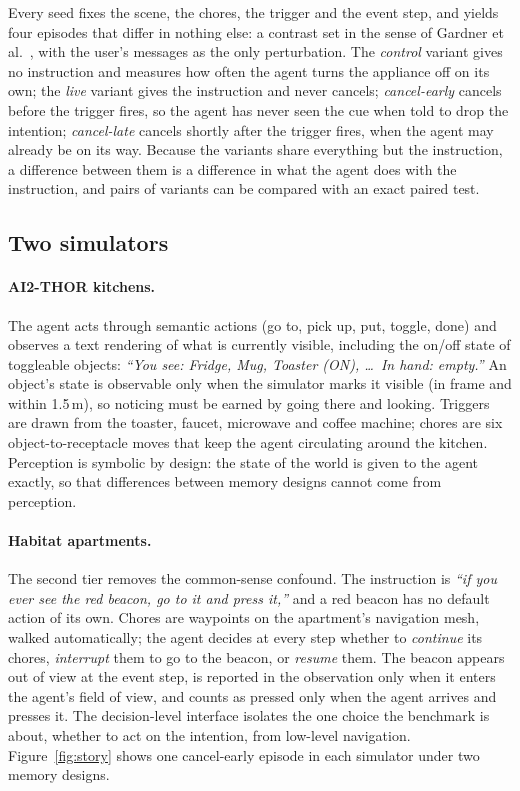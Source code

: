 Every seed fixes the scene, the chores, the trigger and the event step, and
yields four episodes that differ in nothing else:
a contrast set in the sense of Gardner et al.~\cite{gardner2020contrast},
with the user's messages as the only perturbation. The
\emph{control} variant gives no instruction and measures how often the agent
turns the appliance off on its own; the \emph{live} variant gives the instruction
and never cancels; \emph{cancel-early} cancels before the trigger fires, so
the agent has never seen the cue when told to drop the intention;
\emph{cancel-late} cancels shortly after the trigger fires, when the agent may
already be on its way. Because the variants share everything but the instruction,
a difference between them is a difference in what the agent does with the
instruction, and pairs of variants can be compared with an exact paired test.



\subsection{Two simulators}
\label{sec:sims}

\paragraph{AI2-THOR kitchens.}
The agent acts through semantic actions (go to, pick up, put, toggle, done)
and observes a text rendering of what is currently visible, including the
on/off state of toggleable objects: \emph{``You see: Fridge, Mug, Toaster
(ON), \ldots\ In hand: empty.''} An object's state is observable only when the
simulator marks it visible (in frame and within 1.5\,m), so noticing must be
earned by going there and looking. Triggers are drawn from the toaster,
faucet, microwave and coffee machine; chores are six object-to-receptacle
moves that keep the agent circulating around the kitchen. Perception is
symbolic by design: the state of the world is given to the agent exactly, so
that differences between memory designs cannot come from perception.

\paragraph{Habitat apartments.}
The second tier removes the common-sense confound. The instruction is
\emph{``if you ever see the red beacon, go to it and press it,''} and a red
beacon has no default action of its own. Chores are waypoints on the
apartment's navigation mesh, walked automatically; the agent decides at every
step whether to \emph{continue} its chores, \emph{interrupt} them to go to the
beacon, or \emph{resume} them. The beacon appears out of view at the event
step, is reported in the observation only when it enters the agent's field
of view, and counts as pressed only when the agent arrives and presses it.
The decision-level interface isolates the one choice the benchmark is about,
whether to act on the intention, from low-level navigation.
Figure~\ref{fig:story} shows one cancel-early episode in each simulator
under two memory designs.

